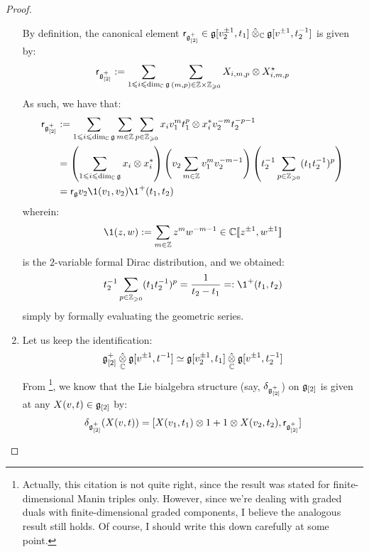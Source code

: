 \begin{proof}
\begin{enumerate}
                        By definition, the canonical element $\sfr_{\g_{[2]}^+} \in \g[v_2^{\pm 1}, t_1] \hattensor_{\bbC} \g[v^{\pm 1}, t_2^{-1}]$ is given by:
                            $$\sfr_{\g_{[2]}^+} := \sum_{1 \leq i \leq \dim_{\bbC} \g} \sum_{(m, p) \in \Z \x \Z_{\geq 0}} X_{i, m, p} \tensor X_{i, m, p}^{\star}$$
                        As such, we have that:
                            $$
                                \begin{aligned}
                                    \sfr_{\g_{[2]}^+} & := \sum_{1 \leq i \leq \dim_{\bbC} \g} \sum_{m \in \Z} \sum_{p \in \Z_{\geq 0}} x_i v_1^m t_1^p \tensor x_i^* v_2^{-m} t_2^{-p - 1}
                                    \\
                                    & = \left( \sum_{1 \leq i \leq \dim_{\bbC} \g} x_i \tensor x_i^* \right) \left( v_2 \sum_{m \in \Z} v_1^m v_2^{-m - 1} \right) \left( t_2^{-1} \sum_{p \in \Z_{\geq 0}} (t_1 t_2^{-1})^p \right)
                                    \\
                                    & = \sfr_{\g} v_2 \1(v_1, v_2) \1^+(t_1, t_2)
                                \end{aligned}
                            $$
                        wherein:
                            $$\1(z, w) := \sum_{m \in \Z} z^m w^{-m - 1} \in \bbC[\![z^{\pm 1}, w^{\pm 1}]\!]$$ 
                        is the $2$-variable formal Dirac distribution, and we obtained:
                            $$t_2^{-1} \sum_{p \in \Z_{\geq 0}} (t_1 t_2^{-1})^p = \frac{1}{t_2 - t_1} =: \1^+(t_1, t_2)$$
                        simply by formally evaluating the geometric series. 
                        \item Let us keep the identification:
                            $$\g_{[2]}^+ \hattensor_{\bbC} \g[v^{\pm 1}, t^{-1}] \cong \g[v_2^{\pm 1}, t_1] \hattensor_{\bbC} \g[v^{\pm 1}, t_2^{-1}]$$
                        From \cite[pp. 5]{etingof_kazhdan_quantisation_1}\footnote{Actually, this citation is not quite right, since the result was stated for finite-dimensional Manin triples only. However, since we're dealing with graded duals with finite-dimensional graded components, I believe the analogous result still holds. Of course, I should write this down carefully at some point.}, we know that the Lie bialgebra structure (say, $\delta_{\mathfrak{g}_{[2]}^+}$) on $\mathfrak{g}_{[2]}$ is given at any $X(v, t) \in \mathfrak{g}_{[2]}$ by:
                            $$\delta_{\g_{[2]}^+}( X(v, t) ) = [X(v_1, t_1) \tensor 1 + 1 \tensor X(v_2, t_2), \sfr_{\g_{[2]}^+}]$$

\end{enumerate}
\end{proof}

